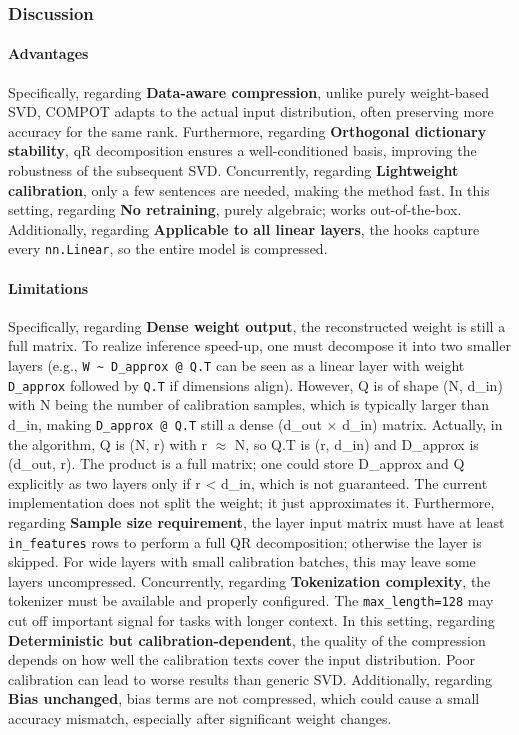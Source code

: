 \subsubsection*{Discussion}

\paragraph{Advantages}

Specifically, regarding \textbf{Data-aware compression}, unlike purely weight-based SVD, COMPOT adapts to the actual input distribution, often preserving more accuracy for the same rank. Furthermore, regarding \textbf{Orthogonal dictionary stability}, qR decomposition ensures a well-conditioned basis, improving the robustness of the subsequent SVD. Concurrently, regarding \textbf{Lightweight calibration}, only a few sentences are needed, making the method fast. In this setting, regarding \textbf{No retraining}, purely algebraic; works out-of-the-box. Additionally, regarding \textbf{Applicable to all linear layers}, the hooks capture every \texttt{nn.Linear}, so the entire model is compressed.


\paragraph{Limitations}

Specifically, regarding \textbf{Dense weight output}, the reconstructed weight is still a full matrix. To realize inference speed-up, one must decompose it into two smaller layers (e.g., \texttt{W \textasciitilde{} D\_approx @ Q.T} can be seen as a linear layer with weight \texttt{D\_approx} followed by \texttt{Q.T} if dimensions align). However, Q is of shape (N, d\_in) with N being the number of calibration samples, which is typically larger than d\_in, making \texttt{D\_approx @ Q.T} still a dense (d\_out $\times$ d\_in) matrix. Actually, in the algorithm, Q is (N, r) with r $\approx$ N, so Q.T is (r, d\_in) and D\_approx is (d\_out, r). The product is a full matrix; one could store D\_approx and Q explicitly as two layers only if r < d\_in, which is not guaranteed. The current implementation does not split the weight; it just approximates it. Furthermore, regarding \textbf{Sample size requirement}, the layer input matrix must have at least \texttt{in\_features} rows to perform a full QR decomposition; otherwise the layer is skipped. For wide layers with small calibration batches, this may leave some layers uncompressed. Concurrently, regarding \textbf{Tokenization complexity}, the tokenizer must be available and properly configured. The \texttt{max\_length=128} may cut off important signal for tasks with longer context. In this setting, regarding \textbf{Deterministic but calibration-dependent}, the quality of the compression depends on how well the calibration texts cover the input distribution. Poor calibration can lead to worse results than generic SVD. Additionally, regarding \textbf{Bias unchanged}, bias terms are not compressed, which could cause a small accuracy mismatch, especially after significant weight changes.


